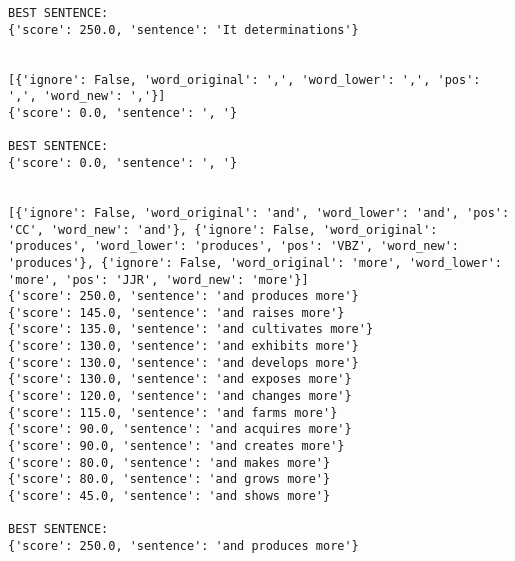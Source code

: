 \documentclass[12pt,a4paper,oneside]{book}
\begin{document}
\begin{verbatim}
BEST SENTENCE:
{'score': 250.0, 'sentence': 'It determinations'}


[{'ignore': False, 'word_original': ',', 'word_lower': ',', 'pos': ',', 'word_new': ','}]
{'score': 0.0, 'sentence': ', '}

BEST SENTENCE:
{'score': 0.0, 'sentence': ', '}


[{'ignore': False, 'word_original': 'and', 'word_lower': 'and', 'pos': 'CC', 'word_new': 'and'}, {'ignore': False, 'word_original': 'produces', 'word_lower': 'produces', 'pos': 'VBZ', 'word_new': 'produces'}, {'ignore': False, 'word_original': 'more', 'word_lower': 'more', 'pos': 'JJR', 'word_new': 'more'}]
{'score': 250.0, 'sentence': 'and produces more'}
{'score': 145.0, 'sentence': 'and raises more'}
{'score': 135.0, 'sentence': 'and cultivates more'}
{'score': 130.0, 'sentence': 'and exhibits more'}
{'score': 130.0, 'sentence': 'and develops more'}
{'score': 130.0, 'sentence': 'and exposes more'}
{'score': 120.0, 'sentence': 'and changes more'}
{'score': 115.0, 'sentence': 'and farms more'}
{'score': 90.0, 'sentence': 'and acquires more'}
{'score': 90.0, 'sentence': 'and creates more'}
{'score': 80.0, 'sentence': 'and makes more'}
{'score': 80.0, 'sentence': 'and grows more'}
{'score': 45.0, 'sentence': 'and shows more'}

BEST SENTENCE:
{'score': 250.0, 'sentence': 'and produces more'}



\end{verbatim}
\end{document}
